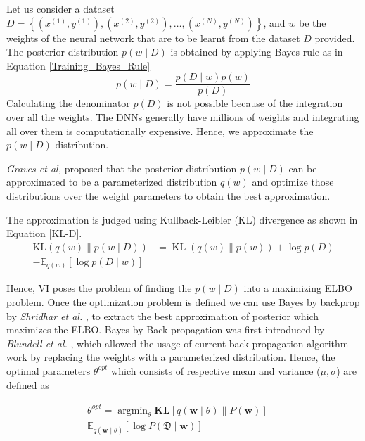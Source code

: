 \documentclass[10pt,twocolumn,letterpaper]{article}
\begin{document}
Let us consider a dataset $D=\left\{\left(x^{(1)}, y^{(1)}\right),\left(x^{(2)}, y^{(2)}\right), \ldots,\left(x^{(N)}, y^{(N)}\right)\right\}$, and $w$ be the weights of the neural network that are to be learnt from the dataset $D$ provided. The posterior distribution $p(w \mid D)$ is obtained by applying Bayes rule as in Equation \ref{Training_Bayes_Rule}
    \begin{equation}
        \label{Training_Bayes_Rule}
        p(w \mid D)=\frac{p(D \mid w) p(w)}{p(D)}
    \end{equation}
Calculating the denominator $p(D)$ is not possible because of the integration over all the weights. The DNNs generally have millions of weights and integrating all over them is computationally expensive. Hence, we approximate the $p(w \mid D)$ distribution.

\textit{Graves et al,} \cite{Graves2011} proposed that the posterior distribution $p(w \mid D)$ can be approximated to be a parameterized distribution $q(w)$ and optimize those distributions over the weight parameters to obtain the best approximation.
        
The approximation is judged using Kullback-Leibler (KL) divergence \cite{Kullback1959} as shown in Equation \ref{KL-D}.
    \begin{equation}
        \label{KL-D}
        \begin{aligned}
            \mathrm{KL}(q(w) \| p(w \mid D)) &=\operatorname{KL}(q(w) \| p(w))+\log p(D)\\ -\mathbb{E}_{q(w)}[\log p(D \mid w)]
        \end{aligned}
    \end{equation}

Hence, VI poses the problem of finding the $p(w \mid D)$ into a maximizing ELBO problem. Once the optimization problem is defined we can use Bayes by backprop by \textit{Shridhar et al.} \cite{shridhar2018uncertainty}, to extract the best approximation of posterior which maximizes the ELBO. Bayes by Back-propagation was first introduced by \textit{Blundell et al.} \cite{Blundell2015}, which allowed the usage of current back-propagation algorithm work by replacing the weights with a parameterized distribution. Hence, the optimal parameters $\theta^{opt}$ which consists of respective mean and variance ($\mu, \sigma$) are defined as  
        
\begin{equation}
\label{optim_param}
    \begin{aligned}
    \theta^{opt} =\operatorname{argmin}_{\theta} \mathbf{K L}[q(\mathbf{w} \mid \theta) \| P(\mathbf{w})]- \\ \mathbb{E}_{q(\mathbf{w} \mid \theta)}[\log P(\mathfrak{D} \mid \mathbf{w})]
    \end{aligned}
\end{equation}
\end{document}
